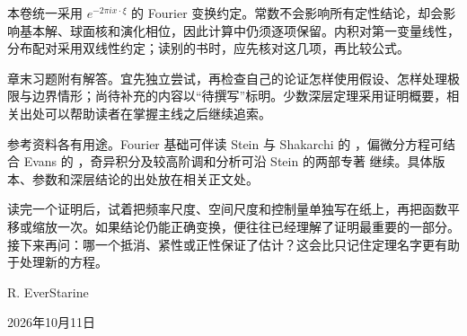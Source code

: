 

\ProseParagraphBreak

本卷统一采用 \(e^{-2\pi i x\cdot\xi}\) 的 Fourier 变换约定。常数不会影响所有定性结论，却会影响基本解、球面核和演化相位，因此计算中仍须逐项保留。内积对第一变量线性，分布配对采用双线性约定；读别的书时，应先核对这几项，再比较公式。

\ProseParagraphBreak

章末习题附有解答。宜先独立尝试，再检查自己的论证怎样使用假设、怎样处理极限与边界情形；尚待补充的内容以“待撰写”标明。少数深层定理采用证明概要，相关出处可以帮助读者在掌握主线之后继续追索。

\ProseParagraphBreak

参考资料各有用途。Fourier 基础可伴读 Stein 与 Shakarchi 的 \cite{Stein2003Fourier}，偏微分方程可结合 Evans 的 \cite{Evans2010Partial}，奇异积分及较高阶调和分析可沿 Stein 的两部专著 \cite{Stein1970Singular,Stein1993Harmonic} 继续。具体版本、参数和深层结论的出处放在相关正文处。

\ProseParagraphBreak

读完一个证明后，试着把频率尺度、空间尺度和控制量单独写在纸上，再把函数平移或缩放一次。如果结论仍能正确变换，便往往已经理解了证明最重要的一部分。接下来再问：哪一个抵消、紧性或正性保证了估计？这会比只记住定理名字更有助于处理新的方程。

\bigskip
\begin{flushright}
R. EverStarine

2026年10月11日
\end{flushright}
